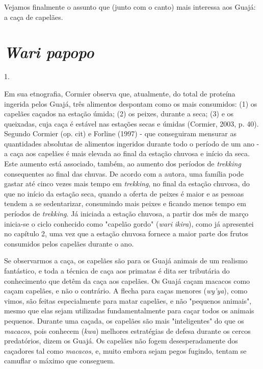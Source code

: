 Vejamos finalmente o assunto que (junto com o canto) mais interessa aos
Guajá: a caça de capelães.

\section{\emph{Wari papopo}}\label{wari-papopo}

1.

Em sua etnografia, Cormier observa que, atualmente, do total de proteína
ingerida pelos Guajá, três alimentos despontam como os mais consumidos:
(1) os capelães caçados na estação úmida; (2) os peixes, durante a seca;
(3) e os queixadas, cuja caça é estável nas estações secas e úmidas
(Cormier, 2003, p. 40). Segundo Cormier (op. cit) e Forline (1997) - que
conseguiram mensurar as quantidades absolutas de alimentos ingeridos
durante todo o período de um ano - a caça aos capelães é mais elevada ao
final da estação chuvosa e início da seca. Este aumento está associado,
também, ao aumento dos períodos de \emph{trekking} consequentes ao final
das chuvas. De acordo com a autora, uma família pode gastar até cinco
vezes mais tempo em \emph{trekking}, no final da estação chuvosa, do que
no início da estação seca, quando a oferta de peixes é maior e as
pessoas tendem a se sedentarizar, consumindo mais peixes e ficando menos
tempo em períodos de \emph{trekking}. Já iniciada a estação chuvosa, a
partir dos mês de março inicia-se o ciclo conhecido como "capelão gordo"
(\emph{wari} \emph{ikira}), como já apresentei no capítulo 2, uma vez
que a estação chuvosa fornece a maior parte dos frutos consumidos pelos
capelães durante o ano.

Se observarmos a caça, os capelães são para os Guajá animais de um
realismo fantástico, e toda a técnica de caça aos primatas é dita ser
tributária do conhecimento que detêm da caça aos capelães. Os Guajá
caçam macacos como caçam capelães, e não o contrário. A flecha para
caças menores (\emph{wy'ya}), como vimos, são feitas especialmente para
matar capelães, e não "pequenos animais", mesmo que elas sejam
utilizadas fundamentalmente para caçar todos os animais pequenos.
Durante uma caçada, os capelães são mais "inteligentes" do que os
\emph{macacos}, pois conhecem (\emph{kwa}) melhores estratégias de
defesa durante os cercos predatórios, dizem os Guajá. Os capelães não
fogem desesperadamente dos caçadores tal como \emph{macacos}, e, muito
embora sejam pegos fugindo, tentam se camuflar o máximo que conseguem.

